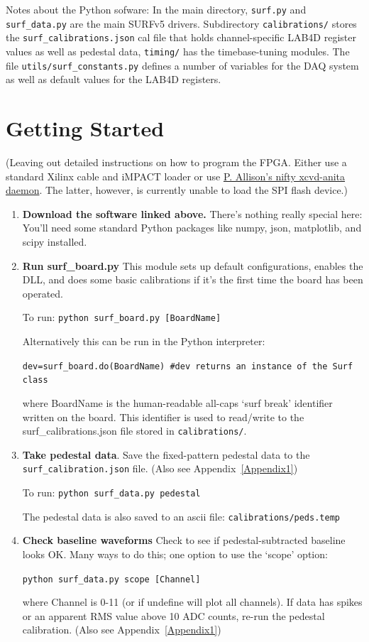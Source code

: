 \documentclass[11pt]{article}
\begin{document}
Notes about the Python sofware:
In the main directory, \verb!surf.py! and \verb!surf_data.py! are the main SURFv5 drivers. Subdirectory \verb!calibrations/! stores the \verb!surf_calibrations.json! cal file that holds channel-specific LAB4D register values as well as pedestal data, \verb!timing/! has the timebase-tuning modules. The file \verb!utils/surf_constants.py! defines a number of variables for the DAQ system as well as default values for the LAB4D registers. 


\section{Getting Started}

(Leaving out detailed instructions on how to program the FPGA. Either use a standard Xilinx cable and iMPACT loader or use \href{https://github.com/barawn/xvcd-anita}{P. Allison's nifty xcvd-anita daemon}. The latter, however, is currently unable to load the SPI flash device.)

\begin{enumerate}

\item
  {\bf Download the software linked above.} There's nothing really special here: You'll need some standard Python packages like numpy, json, matplotlib, and scipy installed.

\item
  {\bf Run surf\_board.py} This module sets up default configurations, enables the DLL, and does some basic calibrations if it's the first time the board has been operated. 

  To run: \verb!python surf_board.py [BoardName]!

  Alternatively this can be run in the Python interpreter:

  \verb!dev=surf_board.do(BoardName) #dev returns an instance of the Surf class!

  \smallskip
  where BoardName is the human-readable all-caps `surf break' identifier written on the board. This identifier is used to read/write to the surf\_calibrations.json file stored in \verb!calibrations/!.

\item {\bf Take pedestal data}. Save the fixed-pattern pedestal data to the \verb!surf_calibration.json! file. (Also see Appendix~\ref{Appendix1})

  To run: \verb!python surf_data.py pedestal!

  The pedestal data is also saved to an ascii file: \verb!calibrations/peds.temp! 

\item {\bf Check baseline waveforms} Check to see if pedestal-subtracted baseline looks OK. Many ways to do this; one option to use the `scope' option:
  
  \verb!python surf_data.py scope [Channel]!

  \smallskip
  where Channel is 0-11 (or if undefine will plot all channels). If data has spikes or an apparent RMS value above 10 ADC counts, re-run the pedestal calibration. (Also see Appendix~\ref{Appendix1})
  
\end{enumerate}
\end{document}
